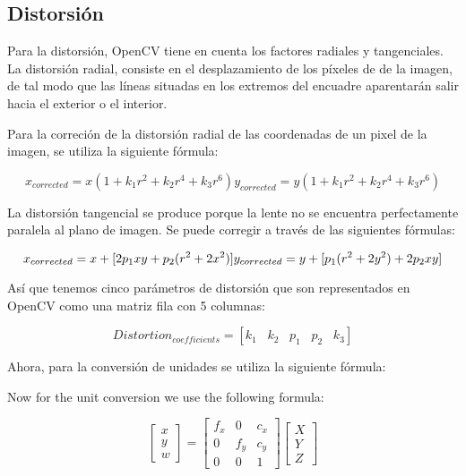 \subsection{Distorsión}
Para la distorsión, OpenCV tiene en cuenta los factores radiales y tangenciales. La distorsión radial, consiste en el desplazamiento de los píxeles de de la imagen, de tal modo que las líneas situadas en los extremos del encuadre aparentarán salir hacia el exterior o el interior.   

Para la correción de la distorsión radial de las coordenadas de un pixel de la imagen, se utiliza la siguiente fórmula:

\begin{equation}
 x_{corrected} = x(1 + k_1 r^2 + k_2 r^4 + k_3 r^6)  
 y_{corrected} = y(1 + k_1 r^2 + k_2 r^4 + k_3 r^6)
\end{equation}

La distorsión tangencial se produce porque la lente no se encuentra perfectamente paralela al plano de imagen. Se puede corregir a través de las siguientes fórmulas:

\begin{equation}
   x_{corrected} = x + [ 2p_1xy + p_2(r^2+2x^2)] \\
   y_{corrected} = y + [ p_1(r^2+ 2y^2)+ 2p_2xy]
 \end{equation}

Así que tenemos cinco parámetros de distorsión que son representados en OpenCV  como una matriz fila con 5 columnas: 

\begin{equation}
  Distortion_{coefficients} = [k_1 \hspace{10pt} k_2 \hspace{10pt} p_1 \hspace{10pt} p_2 \hspace{10pt} k_3]
\end{equation}

Ahora, para la conversión de unidades se utiliza la siguiente fórmula:

Now for the unit conversion we use the following formula:

\begin{equation}
  \left[  \begin{matrix}   x \\   y \\  w \end{matrix} \right ] = \left [ \begin{matrix}   f_x & 0 & c_x \\  0 & f_y & c_y \\   0 & 0 & 1 \end{matrix} \right ] \left [ \begin{matrix}  X \\  Y \\   Z \end{matrix} \right ]
\end{equation}

